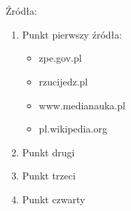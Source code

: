 \documentclass[14pt]{beamer}
\begin{document}
\section{}

\begin{frame}{\color{black}{Dziękuję za uwagę}}
    Źródła:
    \begin{enumerate}
        \item Punkt pierwszy źródła:
            \begin{itemize}
                \item zpe.gov.pl
                \item rzucijedz.pl
                \item www.medianauka.pl
                \item pl.wikipedia.org
        \end{itemize}
        \item Punkt drugi
        \item Punkt trzeci
        \item Punkt czwarty
    \end{enumerate}
\end{frame}
\end{document}
